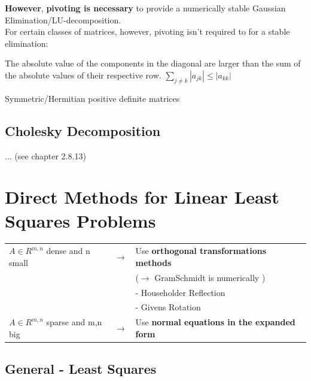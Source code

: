 \documentclass[12pt, a4paper]{article}
\begin{document}
\textbf{However}, \textbf{pivoting is necessary} to provide a numerically stable Gaussian Elimination/LU-decomposition. \\

For certain classes of matrices, however, pivoting isn't required to for a stable elimination:

\begin{description}[labelindent=16pt,style=multiline,leftmargin=7cm, noitemsep]
	\item[Diagonally Dominant Matrix:] The absolute value of the components in the diagonal are larger than the sum of the absolute values of their respective row. $\sum_{j\neq k}|a_{jk}| \leq |a_{kk}|$
	\item[s.p.d. Matrix:] Symmetric/Hermitian positive definite matrices
\end{description}


\subsection{Cholesky Decomposition}
... (see chapter 2.8.13)

\newpage
\section{Direct Methods for Linear Least Squares Problems}

\begin{tabular}{lll}
$A \in R^{m,n}$ dense and n small		& $\rightarrow$ &   Use \textbf{orthogonal transformations methods}  \\ 
															&  & ($\rightarrow$ GramSchmidt is numerically \color{red}{not stable}\color{black}) \\
															&	& - Householder Reflection \\
															&  & - Givens Rotation \hspace{5mm}\\
$A \in R^{m,n}$ sparse and m,n big 	& $\rightarrow$ &	 Use \textbf{normal equations in the expanded form}   \\ 

\end{tabular}


\subsection{General - Least Squares}
\end{document}
